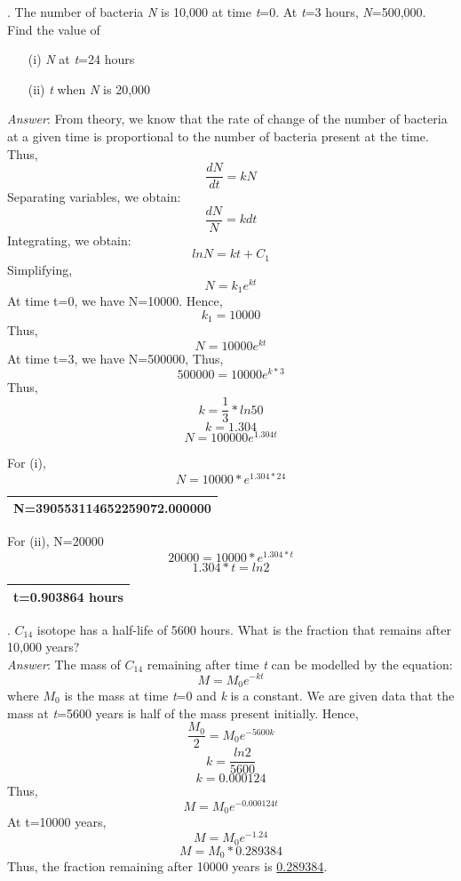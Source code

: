 \documentclass[a4paper,11pt]{article}
\begin{document}
. The number of bacteria \emph{N} is 10,000 at time \emph{t}=0. At \emph{t}=3 hours, \emph{N}=500,000. Find the value of
\begin{enumerate}
\item[(i)]\emph{N} at \emph{t}=24 hours
\\
\item[(ii)]\emph{t} when \emph{N} is 20,000
\end{enumerate}
\emph{Answer}:
From theory, we know that the rate of change of the number of bacteria at a given time is proportional to the number of bacteria present at the time.
Thus,
\[ \frac{dN}{dt} = kN\]
Separating variables, we obtain:
\[ \frac{dN}{N} = kdt \]
Integrating, we obtain:
\[ lnN = kt + C_1\]
Simplifying,
\[N=k_1 e^{kt}\]
At time t=0, we have N=10000. Hence,
\[k_1 = 10000\]
Thus,
\[N=10000e^{kt}\]
At time t=3, we have N=500000,
Thus,
\[500000 = 10000 e^{k*3}\]
Thus,
\[k=\frac{1}{3}* ln50\]
\[k=1.304\]
\[N=100000e^{1.304t}\]

For (i),
\[N=10000*e^{1.304*24}\]
\begin{center}
{\renewcommand{\arraystretch}{1.5}
\begin{tabular}{|c|}
\hline
N=390553114652259072.000000\\
\hline
\end{tabular}}
\end{center}

For (ii), N=20000
\[20000 = 10000 * e^{1.304*t}\]
\[1.304*t = ln2\]
\begin{center}
\begin{tabular}{|c|}
\hline
t=0.903864 hours\\
\hline
\end{tabular}
\end{center}

. $C_{14}$ isotope has a half-life of 5600 hours. What is the fraction that remains after 10,000 years?
\\
\emph{Answer}:
The mass of $C_{14}$ remaining after time \emph{t} can be modelled by the equation:
\[M=M_0e^{-kt}\]
where $M_0$ is the mass at time \emph{t}=0 and \emph{k} is a constant.
We are given data that the mass at \emph{t}=5600 years is half of the mass present initially.
Hence,
\[\frac{M_0}{2} = M_0e^{-5600k}\]
\[k=\frac{ln2}{5600}\]
\[k=0.000124\]
Thus,
\[M=M_0e^{-0.000124t}\]
At t=10000 years,
\[M=M_0e^{-1.24}\]
\[M=M_0*0.289384\]
Thus, the fraction remaining after 10000 years is \underline{0.289384}.
\end{document}
